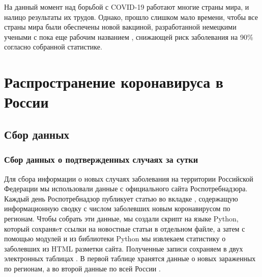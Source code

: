 \documentclass[a4paper, 12pt]{extarticle}
\begin{document}
На данный момент над борьбой с COVID-19 работают многие
страны мира, и налицо результаты их трудов. Однако, прошло слишком мало времени,
чтобы все страны мира были обеспечены новой вакциной, разработанной немецкими
учеными с пока еще рабочим названием , снижающей риск заболевания на
90\% согласно собранной статистике.
\\
\newpage

\section{Распространение коронавируса в России}
\subsection{Сбор данных}
\subsubsection{Сбор данных о подтвержденных случаях за сутки}

Для сбора информации о новых случаях заболевания на территории Российской
Федерации мы использовали данные с официального сайта Роспотребнадзора. Каждый
день Роспотребнадзор публикует статью во вкладке ,
содержащую информационную сводку с числом заболевших новым коронавирусом по
регионам. Чтобы собрать эти данные, мы создали скрипт на языке Python, который
сохраняeт ссылки на новостные статьи в отдельном файле, а затем с помощью
модулей  и  из библиотеки Python
мы извлекаем статистику о заболевших из HTML разметки сайта. Полученные записи
сохраняем в двух электронных таблицах . В первой таблице хранятся
данные о новых зараженных по регионам, а во второй данные по всей России .
\end{document}
